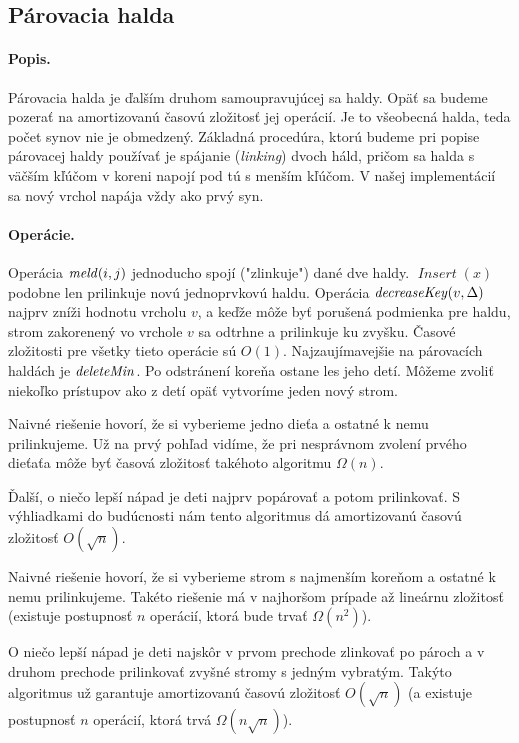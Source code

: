 \subsection{Párovacia halda} 
\paragraph{Popis.}
Párovacia halda je ďalším druhom samoupravujúcej sa haldy. Opäť sa budeme pozerať na amortizovanú časovú zložitosť jej operácií.
Je to všeobecná halda, teda počet synov nie je obmedzený.
Základná procedúra, ktorú budeme pri popise párovacej haldy používať je spájanie (\emph{linking}) dvoch háld,
pričom sa halda s väčším kľúčom v koreni napojí pod tú s menším kľúčom.
V našej implementácií sa nový vrchol napája vždy ako prvý syn.

\paragraph{Operácie.}
Operácia $\mathop{\mathit{meld}}(i,j)$ jednoducho spojí ("zlinkuje") dané dve haldy. $\mathop{\mathit{Insert}}(x)$ podobne len prilinkuje
novú jednoprvkovú haldu.
Operácia $\mathop{\mathit{decreaseKey}}(v, \Delta)$ najprv zníži hodnotu vrcholu $v$, a keďže môže byť porušená podmienka pre haldu,
strom zakorenený vo vrchole $v$ sa odtrhne a prilinkuje ku zvyšku. Časové zložitosti pre všetky tieto operácie
sú $O(1)$. Najzaujímavejšie na párovacích haldách je $\mathop{\mathit{deleteMin}}$. Po odstránení koreňa ostane les jeho detí.
Môžeme zvoliť niekoľko prístupov ako z detí opäť vytvoríme jeden nový strom.

Naivné riešenie hovorí, že si vyberieme jedno dieťa a ostatné k nemu prilinkujeme. Už na prvý pohľad vidíme,
že pri nesprávnom zvolení prvého dieťaťa môže byť časová zložitosť takéhoto algoritmu $\Omega(n)$.

Ďalší, o niečo lepší nápad je deti najprv popárovať a potom prilinkovať. S výhliadkami do budúcnosti nám tento algoritmus dá 
amortizovanú časovú zložitosť $O(\sqrt{n})$.

Naivné riešenie hovorí, že si vyberieme strom s najmenším koreňom a ostatné k nemu prilinkujeme.
Takéto riešenie má v najhoršom prípade až lineárnu zložitosť (existuje postupnosť $n$ operácií,
ktorá bude trvať $\Omega(n^2)$).

O niečo lepší nápad je deti najskôr v prvom prechode zlinkovať po pároch
a v druhom prechode prilinkovať zvyšné stromy s jedným vybratým.
Takýto algoritmus už garantuje amortizovanú časovú zložitosť $O(\sqrt{n})$
(a existuje postupnosť $n$ operácií, ktorá trvá $\Omega(n\sqrt{n})$).

